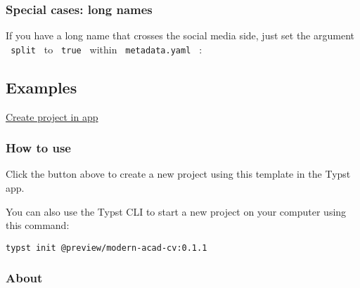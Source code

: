 \subsubsection{Special cases: long
names}\label{special-cases-long-names}

If you have a long name that crosses the social media side, just set the
argument \texttt{\ split\ } to \texttt{\ true\ } within
\texttt{\ metadata.yaml\ } :

\begin{Shaded}
\begin{Highlighting}[]
\end{Highlighting}
\end{Shaded}

\subsection{Examples}\label{examples}


\href{/app?template=modern-acad-cv&version=0.1.1}{Create project in app}

\subsubsection{How to use}\label{how-to-use}

Click the button above to create a new project using this template in
the Typst app.

You can also use the Typst CLI to start a new project on your computer
using this command:

\begin{verbatim}
typst init @preview/modern-acad-cv:0.1.1
\end{verbatim}



\subsubsection{About}\label{about}

